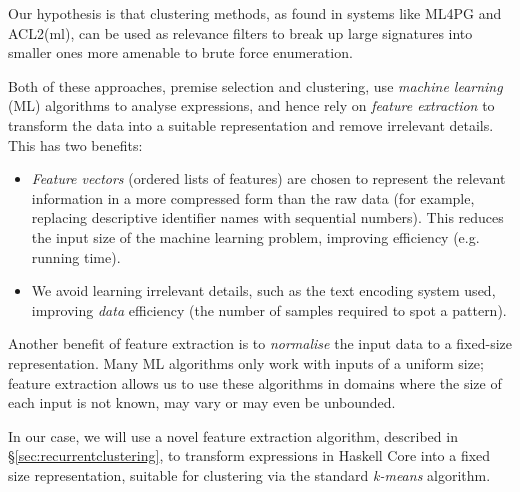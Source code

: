 Our hypothesis is that clustering methods, as found in systems like ML4PG and ACL2(ml), can be used as relevance filters to break up large signatures into smaller ones more amenable to brute force enumeration.

\iffalse TODO: I would play up the clustering intelligence. Clustering is not just about breaking up, it is about discovering significant patterns in data. By forgetting this, you make motivation for your work sound too ``small'' \fi

Both of these approaches, premise selection and clustering, use \emph{machine learning} (ML) algorithms to analyse expressions, and hence rely on \emph{feature extraction} to transform the data into a suitable representation and remove irrelevant details. This has two benefits:

\begin{itemize}
  \item \emph{Feature vectors} (ordered lists of features) are chosen to represent the relevant information in a more compressed form than the raw data (for example, replacing descriptive identifier names with sequential numbers). This reduces the input size of the machine learning problem, improving efficiency (e.g. running time).
  \item We avoid learning irrelevant details, such as the text encoding system used, improving \emph{data} efficiency (the number of samples required to spot a pattern).
\end{itemize}

Another benefit of feature extraction is to \emph{normalise} the input data to a fixed-size representation. Many ML algorithms only work with inputs of a uniform size; feature extraction allows us to use these algorithms in domains where the size of each input is not known, may vary or may even be unbounded.

In our case, we will use a novel feature extraction algorithm, described in \S \ref{sec:recurrentclustering}, to transform expressions in Haskell Core into a fixed size representation, suitable for clustering via the standard \emph{k-means} algorithm.

\iffalse TODO: I have had a look now at section 5. I do not think feature extraction and clustering is explained/defined there, either. Seeing your contribution is feature extraction algorithms, you need to define feature vectors and clusters *here* \fi

